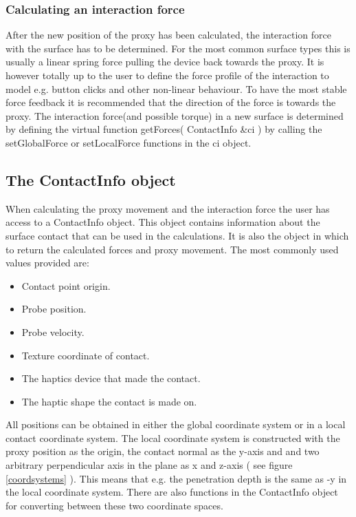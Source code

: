 \subsubsection{Calculating an interaction force}
After the new position of the proxy has been calculated, the interaction force with the surface has to be determined. For the most common surface types this is usually a linear spring force pulling the device back towards the proxy. It is however totally up to the user to define the force profile of the interaction to model e.g. button clicks and other non-linear behaviour. To have the most stable force feedback it is recommended that the direction of the force is towards the proxy.  
The interaction force(and possible torque) in a new surface is determined by defining the virtual function getForces( ContactInfo \&ci ) by calling the setGlobalForce or setLocalForce functions in the ci object. 

\subsection{The ContactInfo object}
When calculating the proxy movement and the interaction force the user has access to a ContactInfo object. This object contains information about the surface contact that can be used in the calculations. It is also the object in which to return the calculated forces and proxy movement. The most commonly used values provided are:

\begin{itemize}
\item Contact point origin.
\item Probe position.
\item Probe velocity.
\item Texture coordinate of contact.
\item The haptics device that made the contact.
\item The haptic shape the contact is made on.
\end{itemize}


All positions can be obtained in either the global coordinate system or
in a local contact coordinate system. The local coordinate system is constructed with the proxy position as the origin, the contact normal as the y-axis and and two arbitrary perpendicular axis in the plane as x and z-axis ( see figure \ref{coordsystems} ). This means that e.g. the penetration depth is the same as -y in the local coordinate system. There are also functions in the ContactInfo object for converting between these two coordinate spaces. 

